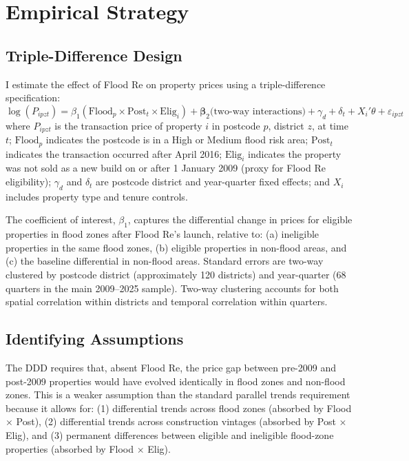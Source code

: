 \documentclass[12pt]{article}
\begin{document}



\section{Empirical Strategy}
\label{sec:strategy}

\subsection{Triple-Difference Design}

I estimate the effect of Flood Re on property prices using a triple-difference specification:
\begin{equation}
\log(P_{ipzt}) = \beta_1 (\text{Flood}_p \times \text{Post}_t \times \text{Elig}_i) + \boldsymbol{\beta}_2 \text{(two-way interactions)} + \gamma_d + \delta_t + X_i'\theta + \varepsilon_{ipzt}
\label{eq:ddd}
\end{equation}
where $P_{ipzt}$ is the transaction price of property $i$ in postcode $p$, district $z$, at time $t$; $\text{Flood}_p$ indicates the postcode is in a High or Medium flood risk area; $\text{Post}_t$ indicates the transaction occurred after April 2016; $\text{Elig}_i$ indicates the property was not sold as a new build on or after 1 January 2009 (proxy for Flood Re eligibility); $\gamma_d$ and $\delta_t$ are postcode district and year-quarter fixed effects; and $X_i$ includes property type and tenure controls.

The coefficient of interest, $\beta_1$, captures the differential change in prices for eligible properties in flood zones after Flood Re's launch, relative to: (a) ineligible properties in the same flood zones, (b) eligible properties in non-flood areas, and (c) the baseline differential in non-flood areas. Standard errors are two-way clustered by postcode district (approximately 120 districts) and year-quarter (68 quarters in the main 2009--2025 sample). Two-way clustering accounts for both spatial correlation within districts and temporal correlation within quarters.

\subsection{Identifying Assumptions}

The DDD requires that, absent Flood Re, the price gap between pre-2009 and post-2009 properties would have evolved identically in flood zones and non-flood zones. This is a weaker assumption than the standard parallel trends requirement because it allows for: (1) differential trends across flood zones (absorbed by Flood $\times$ Post), (2) differential trends across construction vintages (absorbed by Post $\times$ Elig), and (3) permanent differences between eligible and ineligible flood-zone properties (absorbed by Flood $\times$ Elig).
\end{document}

